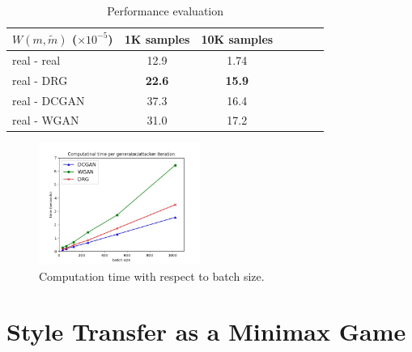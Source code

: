 \documentclass{article}
\begin{document}
\begin{table}[htb]
\caption{Performance evaluation}
\label{tab:evaluation}
\begin{center}
\begin{tabular}{|l|c|c|c|c|c|c|}
\hline
$W(m,\tilde{m})$ ($\times 10^{-5}$) &  1K samples     &  10K samples
\\ \hline
real - real                         &  12.9           &  1.74
\\ \hline
real - DRG                          &  \textbf{22.6}  &  \textbf{15.9}
\\ \hline
real - DCGAN                        &  37.3           &  16.4
\\ \hline
real - WGAN                         &  31.0           &  17.2
\\ \hline
\end{tabular}
\end{center}
\end{table}

\begin{figure}[htb]
\centering
\includegraphics[width=0.47\textwidth]{FIGDRG/computation_time}
\caption{Computation time with respect to batch size. }
\label{fig:time}
\end{figure}

\clearpage



\section{Style Transfer as a Minimax Game}
\label{Sec:ST}

\end{document}
